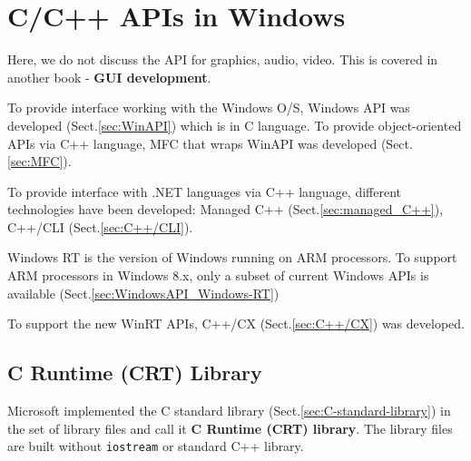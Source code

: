 \chapter{C/C++ APIs in Windows}
\label{chap:CCpp_Windows}

Here, we do not discuss the API for graphics, audio, video.
This is covered in another book - {\bf GUI development}.

To provide interface working with the Windows O/S, Windows API was developed
(Sect.\ref{sec:WinAPI}) which is in C language.
To provide object-oriented APIs via C++ language, MFC that wraps WinAPI was
developed (Sect.\ref{sec:MFC}).

To provide interface with .NET languages via C++ language, different
technologies have been developed: Managed C++ (Sect.\ref{sec:managed_C++}),
C++/CLI (Sect.\ref{sec:C++/CLI}).

Windows RT is the version of Windows running on ARM processors.
To support ARM processors in Windows 8.x, only a subset of current Windows APIs
is available (Sect.\ref{sec:WindowsAPI_Windows-RT})

To support the new WinRT APIs, C++/CX (Sect.\ref{sec:C++/CX}) was developed.

\section{C Runtime (CRT) Library}
\label{sec:CRT}
\label{sec:Standard-C-library-Windows}

Microsoft implemented the C standard library (Sect.\ref{sec:C-standard-library})
in the set of library files and call it {\bf C Runtime (CRT) library}. The
library files are built without \verb!iostream! or standard C++ library.

